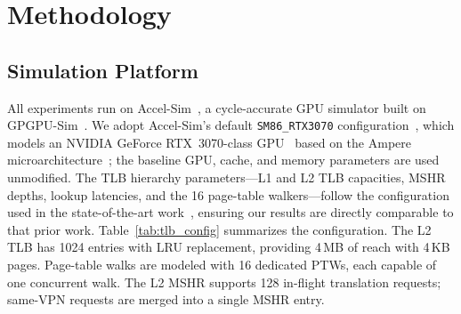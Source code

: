 \section{Methodology}
\label{sec:methodology}

\subsection{Simulation Platform}

All experiments run on Accel-Sim~\cite{accelsim}, a cycle-accurate GPU simulator
built on GPGPU-Sim~\cite{gpgpusim}.
We adopt Accel-Sim's default \texttt{SM86\_RTX3070} configuration~\cite{accelsim},
which models an NVIDIA GeForce RTX~3070-class GPU~\cite{rtx3070} based on the Ampere
microarchitecture~\cite{nvidia_ampere,ampere_microbench}; the baseline GPU, cache, and
memory parameters are used unmodified.
The TLB hierarchy parameters---L1 and L2 TLB capacities, MSHR depths, lookup latencies,
and the 16 page-table walkers---follow the configuration used in the state-of-the-art work~\cite{latpc},
ensuring our results are directly comparable to that prior work.
Table~\ref{tab:tlb_config} summarizes the configuration.
The L2 TLB has 1024 entries with LRU replacement, providing 4\,MB of reach with 4\,KB pages.
Page-table walks are modeled with 16 dedicated PTWs, each capable of one concurrent walk.
The L2 MSHR supports 128 in-flight translation requests; same-VPN requests are merged
into a single MSHR entry.


